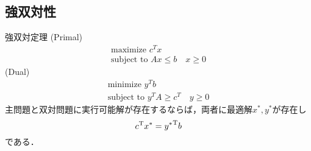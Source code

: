 \subsection{強双対性}
\begin{itembox}[l]{強双対定理}
(Primal)
\begin{align}
    \text{maximize } c^Tx\\
    \text{subject to } Ax\leq b \quad x \geq 0
\end{align}
(Dual)
\begin{align}
    \text{minimize } y^T b\\
    \text{subject to }y^T A \geq c^T \quad y\geq 0
\end{align}
主問題と双対問題に実行可能解が存在するならば，両者に最適解$x^{\ast},y^{\ast}$が存在し
\begin{equation}
    {c}^{\mathrm{T}}x^{\ast}={y^{\ast}}^{\mathrm{T}}b
\end{equation}
である．
\end{itembox}

